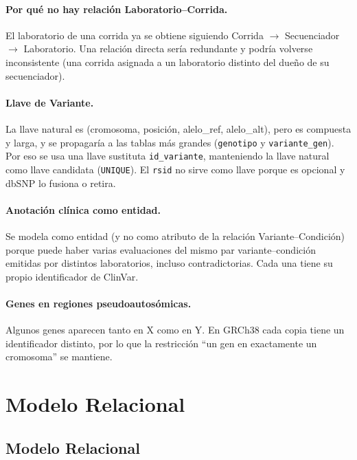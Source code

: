 \documentclass[11pt,a4paper]{article}
\newcommand{\tb}[1]{\texttt{#1}}
\begin{document}
\paragraph{Por qué no hay relación Laboratorio--Corrida.} El laboratorio de una corrida ya se obtiene siguiendo Corrida $\rightarrow$ Secuenciador $\rightarrow$ Laboratorio. Una relación directa sería redundante y podría volverse inconsistente (una corrida asignada a un laboratorio distinto del dueño de su secuenciador).

\paragraph{Llave de Variante.} La llave natural es (cromosoma, posición, alelo\_ref, alelo\_alt), pero es compuesta y larga, y se propagaría a las tablas más grandes (\tb{genotipo} y \tb{variante\_gen}). Por eso se usa una llave sustituta \tb{id\_variante}, manteniendo la llave natural como llave candidata (\tb{UNIQUE}). El \tb{rsid} no sirve como llave porque es opcional y dbSNP lo fusiona o retira.

\paragraph{Anotación clínica como entidad.} Se modela como entidad (y no como atributo de la relación Variante--Condición) porque puede haber varias evaluaciones del mismo par variante--condición emitidas por distintos laboratorios, incluso contradictorias. Cada una tiene su propio identificador de ClinVar.

\paragraph{Genes en regiones pseudoautosómicas.} Algunos genes aparecen tanto en X como en Y. En GRCh38 cada copia tiene un identificador distinto, por lo que la restricción ``un gen en exactamente un cromosoma'' se mantiene.

\section{Modelo Relacional}

\subsection{Modelo Relacional}
\end{document}
